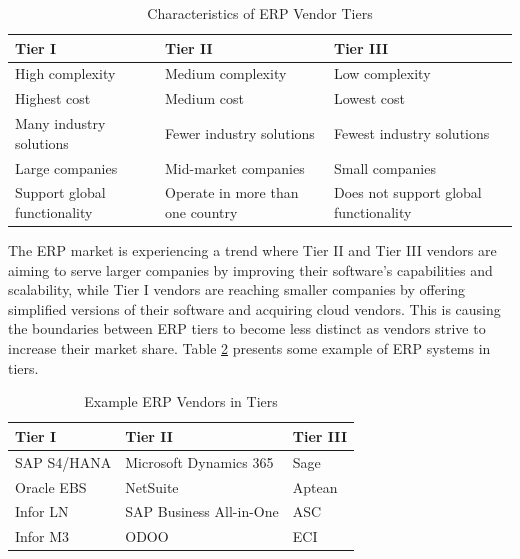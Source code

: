 \begin{table}
    \centering
    \begin{tabular}{p{4.4cm} | p{4.4cm} | p{4.4cm}}
        \hline\hline
        Tier I                       & Tier II                          & Tier III                              \\
        \hline
        High complexity              & Medium complexity                & Low complexity                        \\
        Highest cost                 & Medium cost                      & Lowest cost                           \\
        Many industry solutions      & Fewer industry solutions         & Fewest industry solutions             \\
        Large companies              & Mid-market companies             & Small companies                       \\
        Support global functionality & Operate in more than one country & Does not support global functionality \\
        \hline \hline
    \end{tabular}
    \caption{Characteristics of ERP Vendor Tiers}
    \label{tab:table_ERP_Tiers}
\end{table}
The ERP market is experiencing a trend where Tier II and Tier III vendors are aiming to serve larger companies by improving their software's capabilities and scalability, while Tier I vendors are reaching smaller companies by offering simplified versions of their software and acquiring cloud vendors. This is causing the boundaries between ERP tiers to become less distinct as vendors strive to increase their market share.
Table \ref{tab:table_ERP_vendor} presents some example of ERP systems in  tiers.
\begin{table}
    \centering
    \begin{tabular}{p{4.4cm} | p{4.4cm} | p{4.4cm}}
        \hline\hline
        Tier I      & Tier II                 & Tier III \\
        \hline
        SAP S4/HANA & Microsoft Dynamics 365  & Sage     \\
        Oracle EBS  & NetSuite                & Aptean   \\
        Infor LN    & SAP Business All-in-One & ASC      \\
        Infor M3    & ODOO                    & ECI      \\
        \hline \hline
    \end{tabular}
    \caption{Example ERP Vendors in Tiers}
    \label{tab:table_ERP_vendor}
\end{table}

